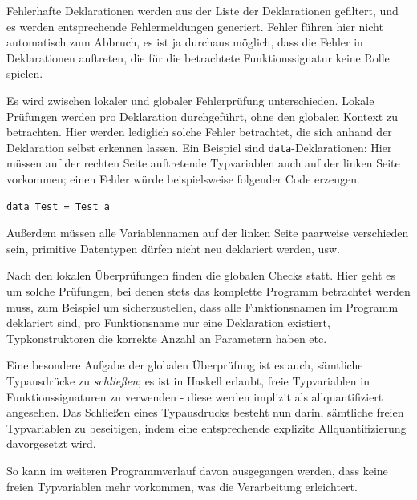 Fehlerhafte Deklarationen werden aus der Liste der Deklarationen gefiltert, und es werden entsprechende Fehlermeldungen
generiert. Fehler führen hier nicht automatisch zum Abbruch, es ist ja durchaus möglich, dass die Fehler in Deklarationen
auftreten, die für die betrachtete Funktionssignatur keine Rolle spielen.

Es wird zwischen lokaler und globaler Fehlerprüfung unterschieden. Lokale Prüfungen werden pro Deklaration durchgeführt,
ohne den globalen Kontext zu betrachten. Hier werden lediglich solche Fehler betrachtet, die sich anhand der Deklaration selbst
erkennen lassen. Ein Beispiel sind \texttt{data}-Deklarationen: Hier müssen auf der rechten Seite auftretende Typvariablen
auch auf der linken Seite vorkommen; einen Fehler würde beispielsweise folgender Code erzeugen.

\begin{verbatim}
data Test = Test a
\end{verbatim}

Außerdem müssen alle Variablennamen auf der linken Seite paarweise verschieden sein, primitive Datentypen dürfen nicht
neu deklariert werden, usw.

Nach den lokalen Überprüfungen finden die globalen Checks statt. Hier geht es um solche Prüfungen, bei denen stets das komplette
Programm betrachtet werden muss, zum Beispiel um sicherzustellen, dass alle Funktionsnamen im Programm deklariert sind,
pro Funktionsname nur eine Deklaration existiert, Typkonstruktoren die korrekte Anzahl an Parametern haben etc.

Eine besondere Aufgabe der globalen Überprüfung ist es auch, sämtliche Typausdrücke zu \textit{schließen}; es ist in Haskell
erlaubt, freie Typvariablen in Funktionssignaturen zu verwenden - diese werden implizit als allquantifiziert angesehen.
Das Schließen eines Typausdrucks besteht nun darin, sämtliche freien Typvariablen zu beseitigen, indem eine entsprechende
explizite Allquantifizierung davorgesetzt wird.

So kann im weiteren Programmverlauf davon ausgegangen werden, dass keine freien Typvariablen mehr vorkommen, was die
Verarbeitung erleichtert.



